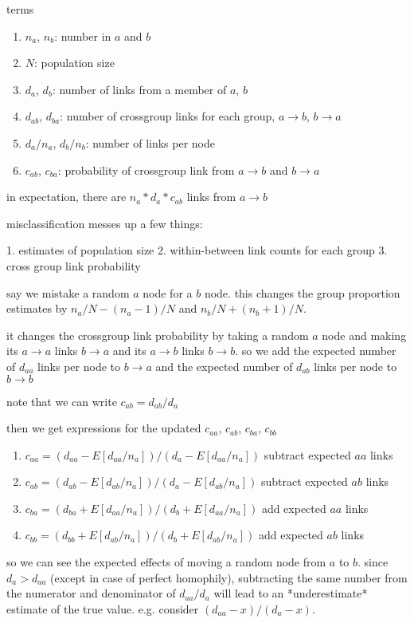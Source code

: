 \documentclass[a4paper]{article}
\begin{document}
terms

\begin{enumerate}
\item $n_a$, $n_b$: number in $a$ and $b$
\item $N$: population size
\item $d_a$, $d_b$: number of links from a member of $a$, $b$
\item $d_{ab}$, $d_{ba}$: number of crossgroup links for each group, $a\to b$, $b\to a$
\item $d_a/n_a$, $d_b/n_b$: number of links per node
\item $c_{ab}$, $c_{ba}$: probability of crossgroup link from $a\to b$ and $b\to a$
\end{enumerate}

in expectation, there are $n_a * d_a * c_{ab}$ links from $a\to b$

misclassification messes up a few things:

1. estimates of population size
2. within-between link counts for each group
3. cross group link probability

say we mistake a random $a$ node for a $b$ node. this changes the group proportion estimates by $n_a/N - (n_a - 1)/N$ and $n_b/N + (n_b + 1)/N$.

it changes the crossgroup link probability by taking a random $a$ node and making its $a\to a$ links $b\to a$ and its $a\to b$ links $b\to b$. so we add the expected number of $d_{aa}$ links per node to $b\to a$ and the expected number of $d_{ab}$ links per node to $b\to b$

note that we can write $c_{ab} = d_{ab} / d_a$

then we get expressions for the updated $c_{aa}$, $c_{ab}$, $c_{ba}$, $c_{bb}$

\begin{enumerate}
\item $c_{aa} = (d_{aa} - E[d_{aa}/n_a]) / (d_a - E[d_{aa}/n_a])$ subtract expected $aa$ links
\item $c_{ab} = (d_{ab} - E[d_{ab}/n_a]) / (d_a - E[d_{ab}/n_a])$ subtract expected $ab$ links
\item $c_{ba} = (d_{ba} + E[d_{aa}/n_a]) / (d_b + E[d_{aa}/n_a])$ add expected $aa$ links
\item $c_{bb} = (d_{bb} + E[d_{ab}/n_a]) / (d_b + E[d_{ab}/n_a])$ add expected $ab$ links
\end{enumerate}


so we can see the expected effects of moving a random node from $a$ to $b$. since $d_a > d_{aa}$ (except in case of perfect homophily), subtracting the same number from the numerator and denominator of $d_{aa} / d_a$ will lead to an *underestimate* estimate of the true value. e.g. consider $(d_{aa} - x) / (d_a - x)$.
\end{document}
